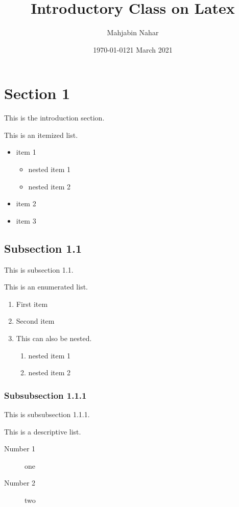 \documentclass[14pt, a4paper]{article} %
\title{Introductory Class on Latex}
\author{Mahjabin Nahar}
\date{\today}
\date{21 March 2021}
\begin{document}
\maketitle
\tableofcontents %
\pagebreak %

\section{Section 1}
\label{sec:intro} %
This is the introduction section.

This is an itemized list.
\begin{itemize}
    \item item 1
    \begin{itemize}
        \item nested item 1
        \item nested item 2
    \end{itemize}
    \item item 2
    \item item 3
\end{itemize}

\subsection{Subsection 1.1}
\label{subsec:1.1} %
This is subsection 1.1.

This is an enumerated list.
\begin{enumerate}
    \item First item
    \item Second item
    \item This can also be nested.
    \begin{enumerate}
        \item nested item 1
        \item nested item 2
    \end{enumerate}
\end{enumerate}

\subsubsection{Subsubsection 1.1.1}
This is subsubsection 1.1.1.

This is a descriptive list.
\begin{description}
\item[Number 1] one
\item[Number 2] two
\end{description}
\end{document}
